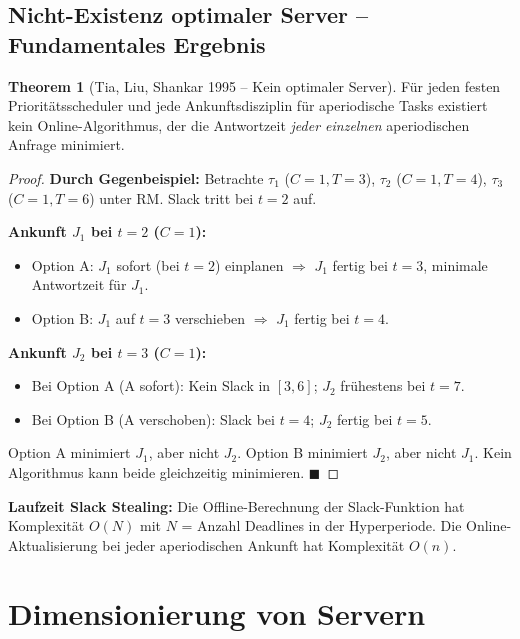 ﻿\documentclass[a4paper,12pt]{report}
\theoremstyle{definition}
\newtheorem{theorem}{Theorem}[chapter]
\begin{document}
\subsection{Nicht-Existenz optimaler Server -- Fundamentales Ergebnis}

\begin{theorem}[Tia, Liu, Shankar 1995 -- Kein optimaler Server]
	\label{thm:nooptserver}
	Für jeden festen Prioritätsscheduler und jede Ankunftsdisziplin für
	aperiodische Tasks existiert kein Online-Algorithmus, der die Antwortzeit
	\emph{jeder einzelnen} aperiodischen Anfrage minimiert.
\end{theorem}

\begin{proof}
	\textbf{Durch Gegenbeispiel:} Betrachte $\tau_1$ ($C=1, T=3$), $\tau_2$ ($C=1, T=4$),
	$\tau_3$ ($C=1, T=6$) unter RM. Slack tritt bei $t=2$ auf.

	\textbf{Ankunft $J_1$ bei $t=2$ ($C=1$):}
	\begin{itemize}
		\item Option A: $J_1$ sofort (bei $t=2$) einplanen $\Rightarrow$ $J_1$ fertig bei $t=3$, minimale Antwortzeit für $J_1$.
		\item Option B: $J_1$ auf $t=3$ verschieben $\Rightarrow$ $J_1$ fertig bei $t=4$.
	\end{itemize}

	\textbf{Ankunft $J_2$ bei $t=3$ ($C=1$):}
	\begin{itemize}
		\item Bei Option A (A sofort): Kein Slack in $[3,6]$; $J_2$ frühestens bei $t=7$.
		\item Bei Option B (A verschoben): Slack bei $t=4$; $J_2$ fertig bei $t=5$.
	\end{itemize}

	Option A minimiert $J_1$, aber nicht $J_2$.
	Option B minimiert $J_2$, aber nicht $J_1$.
	Kein Algorithmus kann beide gleichzeitig minimieren. \hfill$\blacksquare$
\end{proof}

\textbf{Laufzeit Slack Stealing:} Die Offline-Berechnung der Slack-Funktion
hat Komplexität $O(N)$ mit $N$ = Anzahl Deadlines in der Hyperperiode. Die
Online-Aktualisierung bei jeder aperiodischen Ankunft hat Komplexität $O(n)$.

\section{Dimensionierung von Servern}
\end{document}
